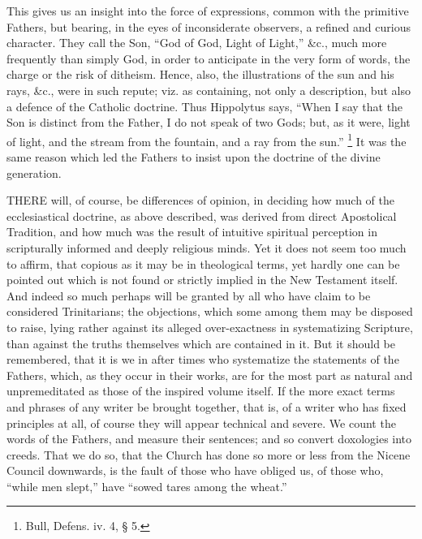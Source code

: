 This gives us an insight into the force of expressions, common with
the primitive Fathers, but bearing, in the eyes of inconsiderate
observers, a refined and curious character. They call the Son,
``God of God, Light of Light,'' \&c., much more frequently
than simply God, in order to anticipate in the very form of words, the
charge or the risk of ditheism. Hence, also, the illustrations of the
sun and his rays, \&c., were in such repute; viz. as containing,
not only a description, but also a defence of the Catholic doctrine.
Thus Hippolytus says, ``When I say that the Son is distinct from
the Father, I do not speak of two Gods; but, as it were, light of
light, and the stream from the fountain, and a ray from the sun.''
\footnote{Bull, Defens. iv. 4, § 5.} It was the same reason
which led the Fathers to insist upon the doctrine of the divine
generation.


THERE will, of course, be differences
of opinion, in deciding how much of the ecclesiastical doctrine, as
above described, was derived from direct Apostolical Tradition, and
how much was the result of intuitive spiritual perception in
scripturally informed and deeply religious minds. Yet it does not seem
too much to affirm, that copious as it may be in theological terms,
yet hardly one can be pointed out which is not found or strictly
implied in the New Testament itself. And indeed so much perhaps will
be granted by all who have claim to be considered Trinitarians; the
objections, which some among them may be disposed to raise, lying
rather against its alleged over-exactness in systematizing Scripture,
than against the truths themselves which are contained in it. But it
should be remembered, that it is we in after times who systematize the
statements of the Fathers, which, as they occur in their works, are
for the most part as natural and unpremeditated as those of the
inspired volume itself. If the more exact terms and phrases of any
writer be brought together, that is, of a writer who has fixed
principles at all, of course they will appear technical and
severe. We count the words of the Fathers, and measure their
sentences; and so convert doxologies into creeds. That we do so, that
the Church has done so more or less from the Nicene Council downwards,
is the fault of those who have obliged us, of those who, ``while
men slept,'' have ``sowed tares among the wheat.''

